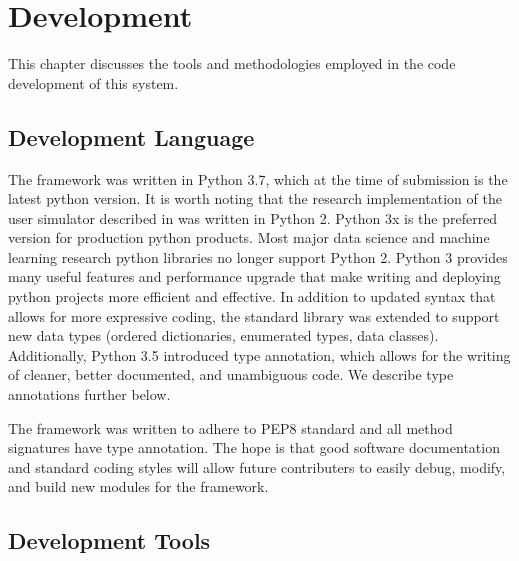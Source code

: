 \chapter{Development}
\label{chap:dev}

This chapter discusses the tools and methodologies employed in the code development of this system. 

\section{Development  Language}

The framework was written in Python 3.7, which at the time of submission is the latest python version. It is worth noting that the research implementation of the user simulator described in \cite{li_usersim} was written in Python 2. Python 3x is the preferred version for production python products. Most major data science and machine learning research python libraries no longer support Python 2. Python 3 provides many useful features and performance upgrade that make writing and deploying python projects more efficient and effective. In addition to updated syntax that allows for more expressive coding, the standard library was extended to support new data types (ordered dictionaries, enumerated types, data classes). Additionally, Python 3.5 introduced type annotation, which allows for the writing of cleaner, better documented, and unambiguous code. We describe type annotations further below.

The framework was written to adhere to PEP8 standard and all method signatures have type annotation. The hope is that good software documentation and standard coding styles will allow future contributers to easily debug, modify, and build new modules for the framework. 

\section{Development  Tools}

